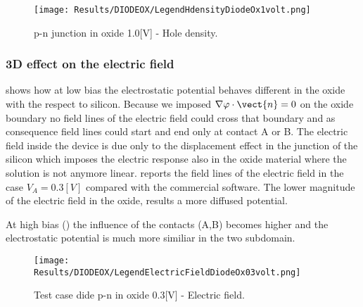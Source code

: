 \vspace{0.5cm}

\begin{figure}[!h]
\centering
{}
\hspace{0.1\textwidth}
\hspace{0.04\textwidth}
{\texttt{[image: Results/DIODEOX/LegendHdensityDiodeOx1volt.png]}}
\caption{p-n junction in oxide 1.0[V] - Hole density.}
\label{fig: hdensity diodeox 1V}
\end{figure}

\clearpage





\subsubsection{3D effect on the electric field}


 shows how at low bias the electrostatic potential behaves different in the oxide with the respect to silicon.
Because we imposed $\nabla \varphi \cdot \vect{n}=0$ on the oxide boundary no field lines of the electric field could cross that boundary and as consequence field lines could start and end only at contact A or B.
The electric field inside the device is due only to the displacement effect in the junction of the silicon which imposes the electric response also in the oxide material where the solution is not anymore linear.  reports the field lines of the electric field in the case $V_A=0.3[V]$ compared with the commercial software. The lower magnitude of the electric field in the oxide, results a more diffused potential.

At high bias () the influence of the contacts (A,B) becomes higher and the electrostatic potential is much more similiar in the two subdomain.


\vspace{1cm}

\begin{figure}[!h]
\centering
{}
\hspace{0.05\textwidth}
\hspace{0.04\textwidth}
{\texttt{[image: Results/DIODEOX/LegendElectricFieldDiodeOx03volt.png]}}
\caption{Test case dide p-n in oxide 0.3[V] - Electric field.}
\label{fig: electric field diode}
\end{figure}

